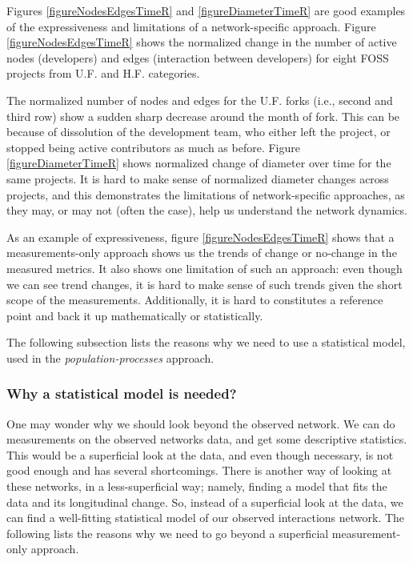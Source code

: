 \documentclass[11pt]{report}
\begin{document}
Figures \ref{figureNodesEdgesTimeR} and \ref{figureDiameterTimeR} are good examples of the expressiveness and limitations of a network-specific approach. Figure \ref{figureNodesEdgesTimeR} shows the normalized change in the number of active nodes (developers) and edges (interaction between developers) for eight FOSS projects from U.F. and H.F. categories. 

The normalized number of nodes and edges for the U.F. forks (i.e., second and third row) show a sudden sharp decrease around the month of fork. This can be because of dissolution of the development team, who either left the project, or stopped being active contributors as much as before. Figure  \ref{figureDiameterTimeR} shows normalized change of diameter over time for the same projects. It is hard to make sense of normalized diameter changes across projects, and this demonstrates the limitations of network-specific approaches, as they may, or may not (often the case), help us understand the network dynamics.

As an example of expressiveness, figure \ref{figureNodesEdgesTimeR} shows that a measurements-only approach shows us the trends of change or no-change in the measured metrics. It also shows one limitation of such an approach: even though we can see trend changes, it is hard to make sense of such trends given the short scope of the measurements. Additionally, it is hard to constitutes a reference point and back it up mathematically or statistically.

The following subsection lists the reasons why we need to use a statistical model, used in the \textit{population-processes} approach.

\subsubsection{Why a statistical model is needed?}
One may wonder why we should look beyond the observed network. We can do measurements on the observed networks data, and get some descriptive statistics. This would be a superficial look at the data, and even though necessary, is not good enough and has several shortcomings. 
There is another way of looking at these networks, in a less-superficial way; namely, finding a model that fits the data and its longitudinal change. So, instead of a superficial look at the data, we can find a well-fitting statistical model of our observed interactions network. The following lists the reasons why we need to go beyond a superficial measurement-only approach. 
\end{document}
